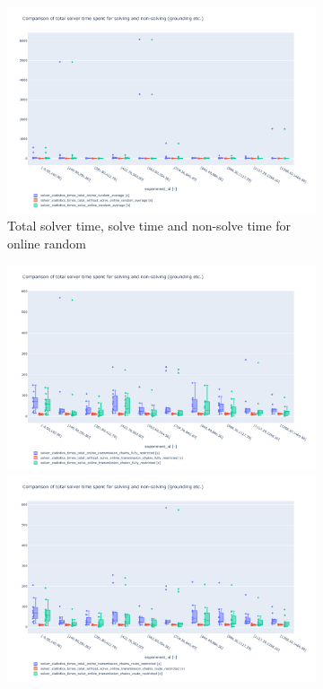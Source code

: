 \documentclass{article}
\begin{document}
\begin{figure}
  \ContinuedFloat
    \begin{subfigure}{\textwidth}
        \includegraphics[width=\textwidth]{Figures/04_computational_results/solve_non_solve_online_random_average.pdf}
        \caption{Total solver time, solve time and non-solve time for online random}
         \label{fig:computationtimes_solve_non_solve_time_online_random}
    \end{subfigure}
    \begin{subfigure}{\textwidth}
        \includegraphics[width=\textwidth]{Figures/04_computational_results/solve_non_solve_online_transmission_chains_fully_restricted.pdf}
                \includegraphics[width=\textwidth]{Figures/04_computational_results/solve_non_solve_online_transmission_chains_route_restricted.pdf}

\end{subfigure}
\end{figure}
\end{document}

